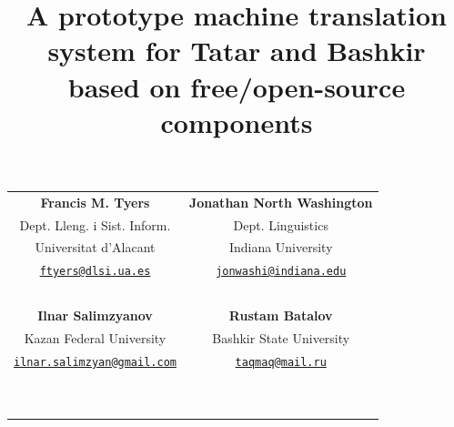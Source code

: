 \documentclass[10pt,xetex]{beamer} %
\date{}
\title{A prototype machine translation system for Tatar and Bashkir \\
              based on free/open-source components}
\begin{document}
\begin{frame}
        \titlepage
\centering
\begin{tabular}{cc}
 {\bf Francis M. Tyers} & {\bf Jonathan North Washington} \\
 Dept. Lleng. i Sist. Inform. & Dept. Linguistics \\
 Universitat d'Alacant & Indiana University \\
 {\tt \href{mailto:ftyers@dlsi.ua.es}{ftyers@dlsi.ua.es}} & {\tt \href{mailto:jonwashi@indiana.edu}{jonwashi@indiana.edu}} \\ 
 ~ & ~ \\
 {\bf Ilnar Salimzyanov} & {\bf Rustam Batalov} \\
 Kazan Federal University & Bashkir State University \\
 {\tt \href{mailto:ilnar.salimzyan@gmail.com}{ilnar.salimzyan@gmail.com}} & {\tt \href{mailto:taqmaq@mail.ru}{taqmaq@mail.ru}} \\
 ~ & ~ \\
 ~ & ~ \\
\end{tabular}

\end{frame}
\end{document}

